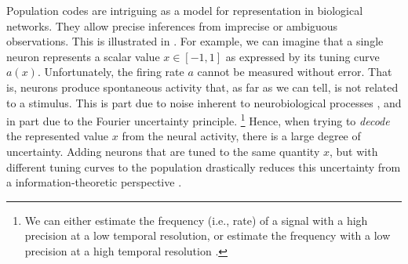 Population codes are intriguing as a model for representation in biological networks.
They allow precise inferences from imprecise or ambiguous observations. This is illustrated in .
For example, we can imagine that a single neuron represents a scalar value $x \in [-1, 1]$ as expressed by its tuning curve $a(x)$.
Unfortunately, the firing rate $a$ cannot be measured without error.
That is, neurons produce spontaneous activity that, as far as we can tell, is not related to a stimulus.
This is part due to noise inherent to neurobiological processes \citep[cf.][Section~2.2.1]{eliasmith2003neural}, and in part due to the Fourier uncertainty principle.%
\footnote{We can either estimate the frequency (i.e., rate) of a signal with a high precision at a low temporal resolution, or estimate the frequency with a low precision at a high temporal resolution \citep{gabor1946theory}.}
Hence, when trying to \emph{decode} the represented value $x$ from the neural activity, there is a large degree of uncertainty.
Adding neurons that are tuned to the same quantity $x$, but with different tuning curves to the population drastically reduces this uncertainty from a information-theoretic perspective \citep{ma2009population}.
